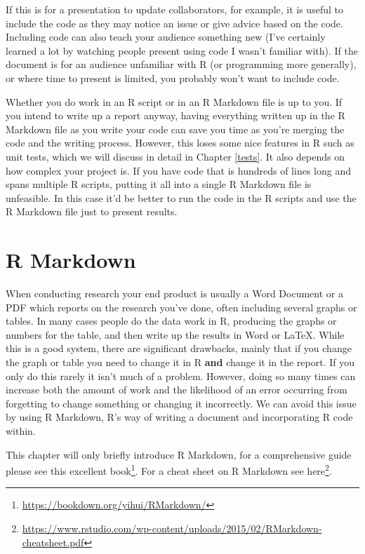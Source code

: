 \documentclass[
]{krantz}
\renewcommand{\href}[2]{#2\footnote{\url{#1}}}
\begin{document}
If this is for a presentation to update collaborators, for example, it is useful to include the code as they may notice an issue or give advice based on the code. Including code can also teach your audience something new (I've certainly learned a lot by watching people present using code I wasn't familiar with). If the document is for an audience unfamiliar with R (or programming more generally), or where time to present is limited, you probably won't want to include code.

Whether you do work in an R script or in an R Markdown file is up to you. If you intend to write up a report anyway, having everything written up in the R Markdown file as you write your code can save you time as you're merging the code and the writing process. However, this loses some nice features in R such as unit tests, which we will discuss in detail in Chapter \ref{tests}. It also depends on how complex your project is. If you have code that is hundreds of lines long and spans multiple R scripts, putting it all into a single R Markdown file is unfeasible. In this case it'd be better to run the code in the R scripts and use the R Markdown file just to present results.

\hypertarget{r-markdown}{%
\chapter{R Markdown}\label{r-markdown}}

When conducting research your end product is usually a Word Document or a PDF which reports on the research you've done, often including several graphs or tables. In many cases people do the data work in R, producing the graphs or numbers for the table, and then write up the results in Word or LaTeX. While this is a good system, there are significant drawbacks, mainly that if you change the graph or table you need to change it in R \textbf{and} change it in the report. If you only do this rarely it isn't much of a problem. However, doing so many times can increase both the amount of work and the likelihood of an error occurring from forgetting to change something or changing it incorrectly. We can avoid this issue by using R Markdown, R's way of writing a document and incorporating R code within.

This chapter will only briefly introduce R Markdown, for a comprehensive guide please see \href{https://bookdown.org/yihui/RMarkdown/}{this excellent book}. For a cheat sheet on R Markdown see \href{https://www.rstudio.com/wp-content/uploads/2015/02/RMarkdown-cheatsheet.pdf}{here}.
\end{document}
